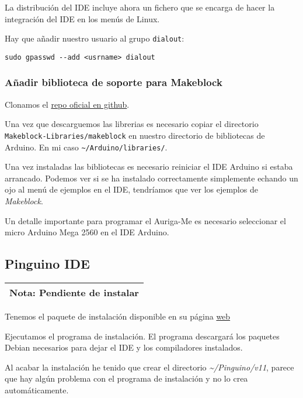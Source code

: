 \documentclass[
  12pt,
  spanish,
]{article}
\begin{document}
La distribución del IDE incluye ahora un fichero que se encarga de hacer
la integración del IDE en los menús de Linux.

Hay que añadir nuestro usuario al grupo \texttt{dialout}:

\begin{verbatim}
sudo gpasswd --add <usrname> dialout
\end{verbatim}

\hypertarget{auxf1adir-biblioteca-de-soporte-para-makeblock}{%
\subsubsection{Añadir biblioteca de soporte para
Makeblock}\label{auxf1adir-biblioteca-de-soporte-para-makeblock}}

Clonamos el
\href{https://github.com/Makeblock-official/Makeblock-Libraries}{repo
oficial en github}.

Una vez que descarguemos las librerias es necesario copiar el directorio
\texttt{Makeblock-Libraries/makeblock} en nuestro directorio de
bibliotecas de Arduino. En mi caso
\texttt{\textasciitilde{}/Arduino/libraries/}.

Una vez instaladas las bibliotecas es necesario reiniciar el IDE Arduino
si estaba arrancado. Podemos ver si se ha instalado correctamente
simplemente echando un ojo al menú de ejemplos en el IDE, tendríamos que
ver los ejemplos de \emph{Makeblock}.

Un detalle importante para programar el Auriga-Me es necesario
seleccionar el micro Arduino Mega 2560 en el IDE Arduino.

\hypertarget{pinguino-ide}{%
\subsection{Pinguino IDE}\label{pinguino-ide}}

\begin{longtable}[]{@{}l@{}}
\toprule
\endhead
\textbf{Nota}: Pendiente de instalar\tabularnewline
\bottomrule
\end{longtable}

Tenemos el paquete de instalación disponible en su página
\href{http://pinguino.cc/download.php}{web}

Ejecutamos el programa de instalación. El programa descargará los
paquetes Debian necesarios para dejar el IDE y los compiladores
instalados.

Al acabar la instalación he tenido que crear el directorio
\emph{\textasciitilde/Pinguino/v11}, parece que hay algún problema con
el programa de instalación y no lo crea automáticamente.
\end{document}
